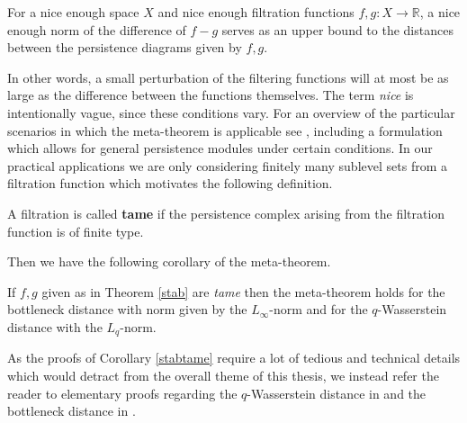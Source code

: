   \begin{theorem}\label{stab}
    For a nice enough space $X$ and nice enough filtration functions $f,g: X \to \mathbb{R}$, a nice enough norm of the difference of $f-g$ serves as an upper bound to the distances between the persistence diagrams given by $f,g$.
  \end{theorem}

  In other words, a small perturbation of the filtering functions will at most be as large as the difference between the functions themselves. The term \textit{nice} is intentionally vague, since these conditions vary. For an overview of the particular scenarios in which the meta-theorem is applicable see \cite{vejdemo}, including a formulation which allows for general persistence modules under certain conditions. In our practical applications we are only considering finitely many sublevel sets from a filtration function which motivates the following definition.

  \begin{definition}
    A filtration is called \textbf{tame} if the persistence complex arising from the filtration function is of finite type.
  \end{definition}

Then we have the following corollary of the meta-theorem.

  \begin{corollary}\label{stabtame}
    If $f,g$ given as in Theorem \ref{stab} are \textit{tame} then the meta-theorem holds for the bottleneck distance with norm given by the $L_{\infty}$-norm and for the $q$-Wasserstein distance with the $L_{q}$-norm.
  \end{corollary}
  As the proofs of Corollary \ref{stabtame} require a lot of tedious and technical details which would detract from the overall theme of this thesis, we instead refer the reader to elementary proofs regarding the $q$-Wasserstein distance in \cite{skraba2021wasserstein} and the bottleneck distance in \cite{skraba2021notes}.
